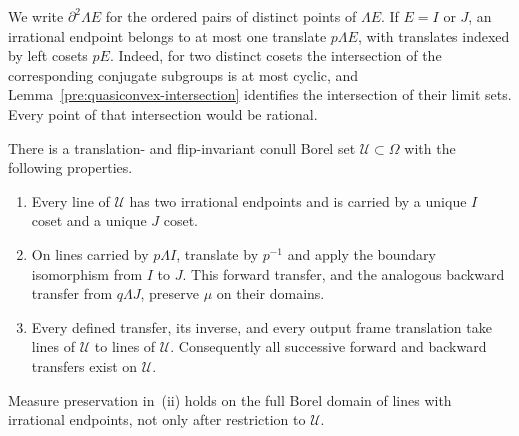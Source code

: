 We write $\partial^2\Lambda E$ for the ordered pairs of distinct
points of $\Lambda E$.  If $E=I$ or $J$, an irrational endpoint
belongs to at most one translate $p\Lambda E$, with translates
indexed by left cosets $pE$.  Indeed, for two distinct cosets the
intersection of the corresponding conjugate subgroups is at most
cyclic, and Lemma~\ref{pre:quasiconvex-intersection} identifies the
intersection of their limit sets.  Every point of that intersection
would be rational.

\begin{proposition}\label{stat:transfers}
There is a translation- and flip-invariant conull Borel set
$\mathcal U\subset\Omega$ with the following properties.
\begin{enumerate}[label=\textup{(\roman*)}]
\item Every line of $\mathcal U$ has two irrational endpoints and is
carried by a unique $I$ coset and a unique $J$ coset.
\item On lines carried by $p\Lambda I$, translate by $p^{-1}$ and
apply the boundary isomorphism from $I$ to $J$.  This forward
transfer, and the analogous backward transfer from $q\Lambda J$,
preserve $\mu$ on their domains.
\item Every defined transfer, its inverse, and every output frame
translation take lines of $\mathcal U$ to lines of $\mathcal U$.
Consequently all successive forward and backward transfers exist on
$\mathcal U$.
\end{enumerate}
Measure preservation in~\textup{(ii)} holds on the full Borel domain
of lines with irrational endpoints, not only after restriction to
$\mathcal U$.
\end{proposition}
